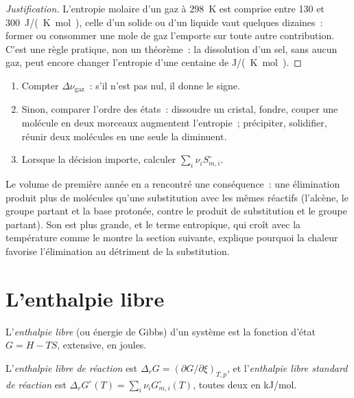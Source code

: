 \begin{proof}[Justification]
L'entropie molaire d'un gaz à \qty{298}{K} est comprise entre 130 et
\qty{300}{J/(K.mol)}, celle d'un solide ou d'un liquide vaut quelques dizaines~: former ou
consommer une mole de gaz l'emporte sur toute autre contribution. C'est une
règle pratique, non un théorème~: la dissolution d'un sel, sans aucun gaz, peut
encore changer l'entropie d'une centaine de \unit{J/(K.mol)}.
\end{proof}

\begin{method}\label{met:b2:reaction-free-energy:entropy-sign}
\begin{enumerate}
  \item Compter $\Delta\nu_{\text{gaz}}$~: s'il n'est pas nul, il donne le
        signe.
  \item Sinon, comparer l'ordre des états~: dissoudre un cristal,
        fondre, couper une molécule en deux morceaux augmentent l'entropie~;
        précipiter, solidifier, réunir deux molécules en une seule la diminuent.
  \item Lorsque la décision importe, calculer $\sum_i\nu_iS^\circ_{m,i}$.
\end{enumerate}
\end{method}

Le volume de première année en a rencontré une conséquence~: une élimination produit plus de molécules
qu'une substitution avec les mêmes réactifs (l'alcène, le groupe partant
et la base protonée, contre le produit de substitution et le groupe
partant). Son  est plus grande, et le terme entropique, qui croît
avec la température comme le montre la section suivante, explique pourquoi la chaleur favorise
l'élimination au détriment de la substitution.

\section{L'enthalpie libre}

\begin{definition}\label{def:b2:reaction-free-energy:gibbs-energy}
L'\emph{enthalpie libre} (ou énergie de Gibbs) d'un système
est la fonction d'état $G = H - TS$, extensive, en joules.
\end{definition}

\begin{definition}\label{def:b2:reaction-free-energy:reaction-gibbs}
L'\emph{enthalpie libre de réaction} est $\Delta_r G
= (\partial G/\partial\xi)_{T,p}$, et l'\emph{enthalpie libre standard de
réaction} est $\Delta_r G^\circ(T) =
\sum_i\nu_iG^\circ_{m,i}(T)$, toutes deux en \unit{kJ/mol}.
\end{definition}

